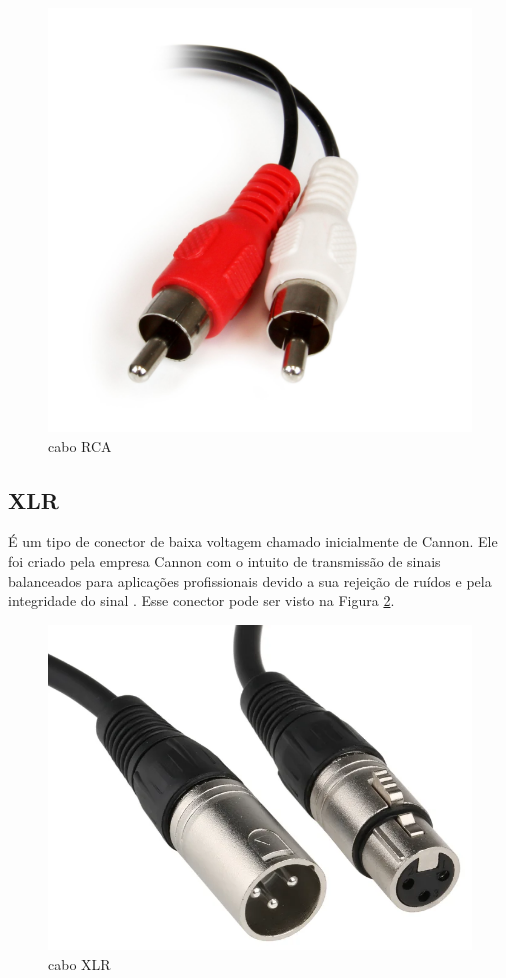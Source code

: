  \begin{figure}[h]
	\centering
    \includegraphics[scale=0.1]{figuras/fig22.png}
	\caption{cabo RCA}
	\label{fig22}
\end{figure}

\subsection{XLR}
É um tipo de conector de baixa voltagem chamado inicialmente de Cannon. Ele foi criado pela empresa Cannon com o intuito de transmissão de sinais balanceados para aplicações profissionais devido a sua rejeição de ruídos e pela integridade do sinal \cite{bartlett}. Esse conector pode ser visto na Figura \ref{fig23}.

\begin{figure}[h]
	\centering
    \includegraphics[scale=0.2]{figuras/fig23.png}
	\caption{cabo XLR}
	\label{fig23}
\end{figure}

